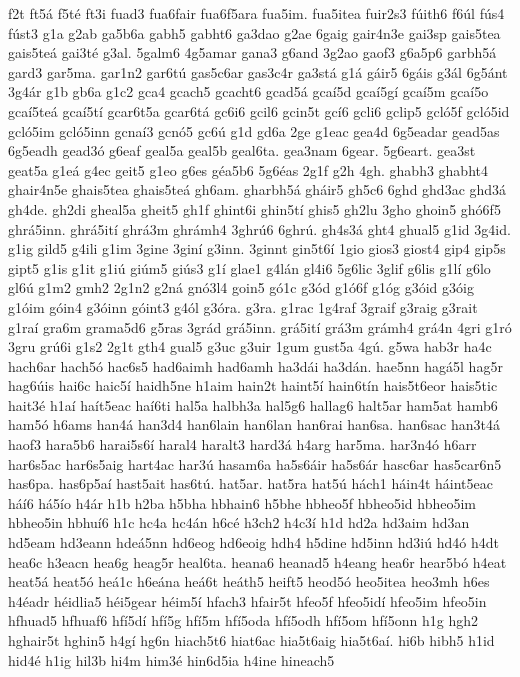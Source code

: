 {f2t
ft5á
f5té
ft3i
fuad3
fua6fair
fua6f5ara
fua5im.
fua5itea
fuir2s3
fúith6
f6úl
fús4
fúst3
g1a
g2ab
ga5b6a
gabh5
gabht6
ga3dao
g2ae
6gaig
gair4n3e
gai3sp
gais5tea
gais5teá
gai3té
g3al.
5galm6
4g5amar
gana3
g6and
3g2ao
gaof3
g6a5p6
garbh5á
gard3
gar5ma.
gar1n2
gar6tú
gas5c6ar
gas3c4r
ga3stá
g1á
gáir5
6gáis
g3ál
6g5ánt
3g4ár
g1b
gb6a
g1c2
gca4
gcach5
gcacht6
gcad5á
gcaí5d
gcaí5gí
gcaí5m
gcaí5o
gcaí5teá
gcaí5tí
gcar6t5a
gcar6tá
gc6i6
gcil6
gcin5t
gcí6
gcli6
gclip5
gcló5f
gcló5id
gcló5im
gcló5inn
gcnaí3
gcnó5
gc6ú
g1d
gd6a
2ge
g1eac
gea4d
6g5eadar
gead5as
6g5eadh
gead3ó
g6eaf
geal5a
geal5b
geal6ta.
gea3nam
6gear.
5g6eart.
gea3st
geat5a
g1eá
g4ec
geit5
g1eo
g6es
géa5b6
5g6éas
2g1f
g2h
4gh.
ghabh3
ghabht4
ghair4n5e
ghais5tea
ghais5teá
gh6am.
gharbh5á
gháir5
gh5c6
6ghd
ghd3ac
ghd3á
gh4de.
gh2di
gheal5a
gheit5
gh1f
ghint6i
ghin5tí
ghis5
gh2lu
3gho
ghoin5
ghó6f5
ghrá5inn.
ghrá5ití
ghrá3m
ghrámh4
3ghrú6
6ghrú.
gh4s3á
ght4
ghual5
g1id
3g4id.
g1ig
gild5
g4ili
g1im
3gine
3giní
g3inn.
3ginnt
gin5t6í
1gio
gios3
giost4
gip4
gip5s
gipt5
g1is
g1it
g1iú
giúm5
giús3
g1í
glae1
g4lán
gl4i6
5g6lic
3glif
g6lis
g1lí
g6lo
gl6ú
g1m2
gmh2
2g1n2
g2ná
gnó3l4
goin5
gó1c
g3ód
g1ó6f
g1óg
g3óid
g3óig
g1óim
góin4
g3óinn
góint3
g4ól
g3óra.
g3ra.
g1rac
1g4raf
3graif
g3raig
g3rait
g1raí
gra6m
grama5d6
g5ras
3grád
grá5inn.
grá5ití
grá3m
grámh4
grá4n
4gri
g1ró
3gru
grú6i
g1s2
2g1t
gth4
gual5
g3uc
g3uir
1gum
gust5a
4gú.
g5wa
hab3r
ha4c
hach6ar
hach5ó
hac6s5
had6aimh
had6amh
ha3dái
ha3dán.
hae5nn
hagá5l
hag5r
hag6úis
hai6c
haic5í
haidh5ne
h1aim
hain2t
haint5í
hain6tín
hais5t6eor
hais5tic
hait3é
h1aí
haít5eac
haí6ti
hal5a
halbh3a
hal5g6
hallag6
halt5ar
ham5at
hamb6
ham5ó
h6ams
han4á
han3d4
han6lain
han6lan
han6rai
han6sa.
han6sac
han3t4á
haof3
hara5b6
harai5s6í
haral4
haralt3
hard3á
h4arg
har5ma.
har3n4ó
h6arr
har6s5ac
har6s5aig
hart4ac
har3ú
hasam6a
ha5s6áir
ha5s6ár
hasc6ar
has5car6n5
has6pa.
has6p5aí
hast5ait
has6tú.
hat5ar.
hat5ra
hat5ú
hách1
háin4t
háint5eac
háí6
há5ío
h4ár
h1b
h2ba
h5bha
hbhain6
h5bhe
hbheo5f
hbheo5id
hbheo5im
hbheo5in
hbhuí6
h1c
hc4a
hc4án
h6cé
h3ch2
h4c3í
h1d
hd2a
hd3aim
hd3an
hd5eam
hd3eann
hdeá5nn
hd6eog
hd6eoig
hdh4
h5dine
hd5inn
hd3iú
hd4ó
h4dt
hea6c
h3eacn
hea6g
heag5r
heal6ta.
heana6
heanad5
h4eang
hea6r
hear5bó
h4eat
heat5á
heat5ó
heá1c
h6eána
heá6t
heáth5
heift5
heod5ó
heo5itea
heo3mh
h6es
h4éadr
héidlia5
héi5gear
héim5í
hfach3
hfair5t
hfeo5f
hfeo5idí
hfeo5im
hfeo5in
hfhuad5
hfhuaf6
hfí5dí
hfí5g
hfí5m
hfí5oda
hfí5odh
hfí5om
hfí5onn
h1g
hgh2
hghair5t
hghin5
h4gí
hg6n
hiach5t6
hiat6ac
hia5t6aig
hia5t6aí.
hi6b
hibh5
h1id
hid4é
h1ig
hil3b
hi4m
him3é
hin6d5ia
h4ine
hineach5
}
